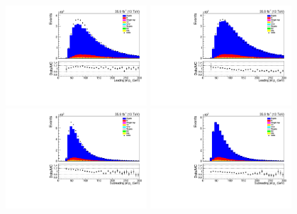 \begin{figure}[htbp]
\centering
\includegraphics[width=0.47\textwidth]{figs/background-estimation/plots/unblinded/DY_control_old_prompt_ee_ttbarInc/leadingJetPt_SingleTop_jetSel_ee.pdf}
\includegraphics[width=0.47\textwidth]{figs/background-estimation/plots/unblinded/DY_control_old_prompt_ee_DYamcatnlo/leadingJetPt_SingleTop_jetSel_ee.pdf}
\\
\includegraphics[width=0.47\textwidth]{figs/background-estimation/plots/unblinded/DY_control_old_prompt_ee_ttbarInc/secondJetPt_SingleTop_jetSel_ee.pdf}
\includegraphics[width=0.47\textwidth]{figs/background-estimation/plots/unblinded/DY_control_old_prompt_ee_DYamcatnlo/secondJetPt_SingleTop_jetSel_ee.pdf}
\\

\end{figure}
